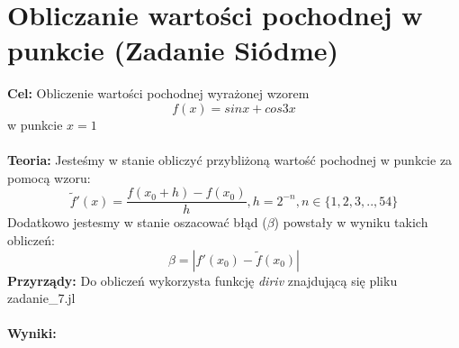 \documentclass{article}
\begin{document}
\section{Obliczanie wartości pochodnej w punkcie (Zadanie Siódme)}
\noindent \textbf{Cel:} Obliczenie wartości pochodnej wyrażonej wzorem
$$f(x) = sinx + cos3x$$
w punkcie $x=1$\\\\
\noindent \textbf{Teoria:} Jesteśmy w stanie obliczyć przybliżoną wartość pochodnej w punkcie za pomocą wzoru:
$$ \widetilde{f}'(x) = \frac{f(x_0 + h) - f(x_0)}{h}, h=2^{-n},n\in\{1,2,3,..,54\}$$
Dodatkowo jestesmy w stanie oszacować błąd ($\beta$) powstały w wyniku takich obliczeń:
$$ \beta = | f'(x_0) - \widetilde{f}(x_0) |$$
\noindent \textbf{Przyrządy:} Do obliczeń wykorzysta funkcję \textit{diriv} znajdującą się  pliku zadanie\_7.jl \\\\
\noindent \textbf{Wyniki:}
\end{document}
